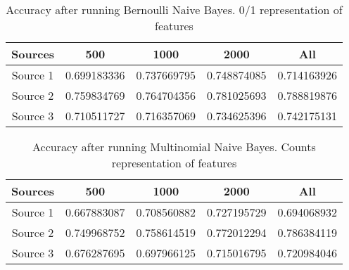 \begin{table}[ht]
    \begin{center}


    \caption{Accuracy after running Bernoulli Naive Bayes. 0/1 representation of features}
    \begin{tabular}[c]{|c|c|c|c|c|}
        \hline
        Sources & 500 & 1000 & 2000 & All \\
        \hline
        Source 1 & 0.699183336 & 0.737669795 & 0.748874085 & 0.714163926 \\
        Source 2 & 0.759834769 & 0.764704356 & 0.781025693 & 0.788819876 \\
        Source 3 & 0.710511727 & 0.716357069 & 0.734625396 & 0.742175131 \\
        \hline
    \end{tabular}

    \label{table3}
   \end{center}
\end{table}


\begin{table}[ht]
    \begin{center}
    \caption{Accuracy after running Multinomial Naive Bayes. Counts representation of features}
    \begin{tabular}[c]{|c|c|c|c|c|}
        \hline
        Sources & 500 & 1000 & 2000 & All \\
        \hline
        Source 1 & 0.667883087 & 0.708560882 & 0.727195729 & 0.694068932 \\
        Source 2 & 0.749968752 & 0.758614519 & 0.772012294 & 0.786384119 \\
        Source 3 & 0.676287695 & 0.697966125 & 0.715016795 & 0.720984046 \\
        \hline
    \end{tabular}

    \label{table4}
   \end{center}
\end{table}


